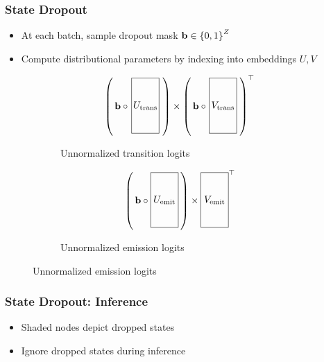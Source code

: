\documentclass{beamer}
\begin{document}
\begin{frame}
\frametitle{State Dropout}
\begin{itemize}
\item At each batch, sample dropout mask $\mathbf{b} \in \left\{0,1\right\}^{Z}$
\item Compute distributional parameters by indexing into embeddings $U,V$
\end{itemize}

\begin{center}
\begin{figure}
\begin{subfigure}{0.49\textwidth}
\centering
\[
\left(\,
\mathbf{b} \circ \vcenter{\hbox{\begin{tikzpicture}[baseline=-0.5ex]
    \draw (0,0) rectangle (1,2) node[pos=.5] {$U_{\textnormal{trans}}$};
\end{tikzpicture}}}
\,\right)
\times
\left(\,
\mathbf{b} \circ
\vcenter{\hbox{\begin{tikzpicture}[baseline=-0.5ex]
    \draw (0,0) rectangle (1,2) node[pos=.5] {$V_{\textnormal{trans}}$};
\end{tikzpicture}}}
\,\right)^\top
\]
\caption{Unnormalized transition logits}
\end{subfigure}
\begin{subfigure}{0.49\textwidth}
\centering
\[
\left(\,
\mathbf{b} \circ \vcenter{\hbox{\begin{tikzpicture}[baseline=-0.5ex]
    \draw (0,0) rectangle (1,2) node[pos=.5] {$U_{\textnormal{emit}}$};
\end{tikzpicture}}}
\,\right)
\times
\vcenter{\hbox{\begin{tikzpicture}[baseline=-0.5ex]
    \draw (0,0) rectangle (1,2) node[pos=.5] {$V_{\textnormal{emit}}$};
\end{tikzpicture}}}
^\top
\]
\caption{Unnormalized emission logits}
\end{subfigure}
\end{figure}
\end{center}
\end{frame}

\begin{frame}
\frametitle{State Dropout: Inference}
\begin{center}
\resizebox{0.8\width}{0.8\height}{

}
\end{center}
\begin{itemize}
\item Shaded nodes depict dropped states
\item Ignore dropped states during inference
\end{itemize}
\end{frame}
\end{document}
